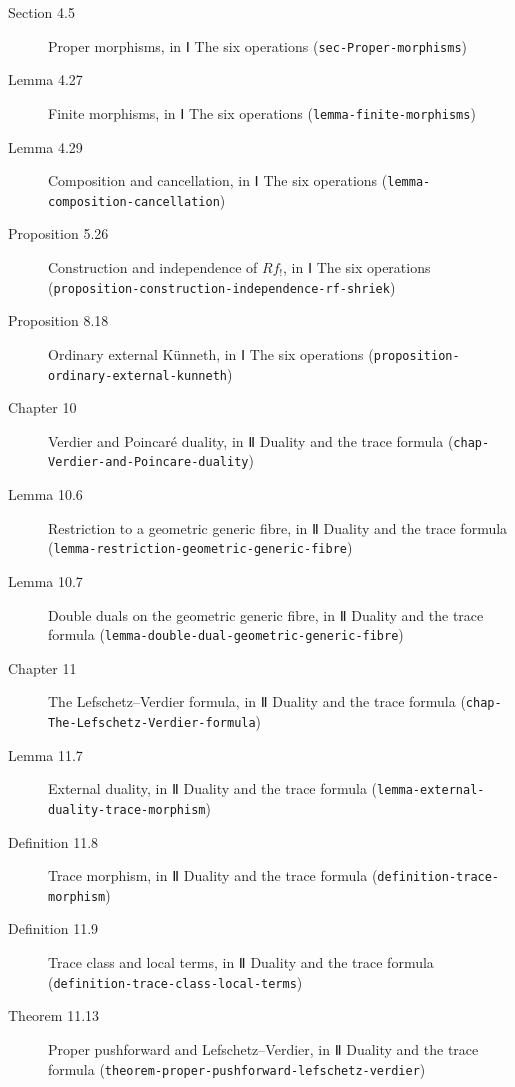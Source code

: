 \documentclass[11pt]{article}
\newcommand{\bpslug}[1]{\texttt{#1}}
\begin{document}
\begin{description}
\item[Section 4.5] Proper morphisms, in Ⅰ The six operations (\bpslug{sec-{}\allowbreak{}Proper-{}\allowbreak{}morphisms})
\item[Lemma 4.27] Finite morphisms, in Ⅰ The six operations (\bpslug{lemma-{}\allowbreak{}finite-{}\allowbreak{}morphisms})
\item[Lemma 4.29] Composition and cancellation, in Ⅰ The six operations (\bpslug{lemma-{}\allowbreak{}composition-{}\allowbreak{}cancellation})
\item[Proposition 5.26] Construction and independence of $Rf_!$, in Ⅰ The six operations (\bpslug{proposition-{}\allowbreak{}construction-{}\allowbreak{}independence-{}\allowbreak{}rf-{}\allowbreak{}shriek})
\item[Proposition 8.18] Ordinary external Künneth, in Ⅰ The six operations (\bpslug{proposition-{}\allowbreak{}ordinary-{}\allowbreak{}external-{}\allowbreak{}kunneth})
\item[Chapter 10] Verdier and Poincaré duality, in Ⅱ Duality and the trace formula (\bpslug{chap-{}\allowbreak{}Verdier-{}\allowbreak{}and-{}\allowbreak{}Poincare-{}\allowbreak{}duality})
\item[Lemma 10.6] Restriction to a geometric generic fibre, in Ⅱ Duality and the trace formula (\bpslug{lemma-{}\allowbreak{}restriction-{}\allowbreak{}geometric-{}\allowbreak{}generic-{}\allowbreak{}fibre})
\item[Lemma 10.7] Double duals on the geometric generic fibre, in Ⅱ Duality and the trace formula (\bpslug{lemma-{}\allowbreak{}double-{}\allowbreak{}dual-{}\allowbreak{}geometric-{}\allowbreak{}generic-{}\allowbreak{}fibre})
\item[Chapter 11] The Lefschetz–Verdier formula, in Ⅱ Duality and the trace formula (\bpslug{chap-{}\allowbreak{}The-{}\allowbreak{}Lefschetz-{}\allowbreak{}Verdier-{}\allowbreak{}formula})
\item[Lemma 11.7] External duality, in Ⅱ Duality and the trace formula (\bpslug{lemma-{}\allowbreak{}external-{}\allowbreak{}duality-{}\allowbreak{}trace-{}\allowbreak{}morphism})
\item[Definition 11.8] Trace morphism, in Ⅱ Duality and the trace formula (\bpslug{definition-{}\allowbreak{}trace-{}\allowbreak{}morphism})
\item[Definition 11.9] Trace class and local terms, in Ⅱ Duality and the trace formula (\bpslug{definition-{}\allowbreak{}trace-{}\allowbreak{}class-{}\allowbreak{}local-{}\allowbreak{}terms})
\item[Theorem 11.13] Proper pushforward and Lefschetz–Verdier, in Ⅱ Duality and the trace formula (\bpslug{theorem-{}\allowbreak{}proper-{}\allowbreak{}pushforward-{}\allowbreak{}lefschetz-{}\allowbreak{}verdier})

\end{description}
\end{document}
